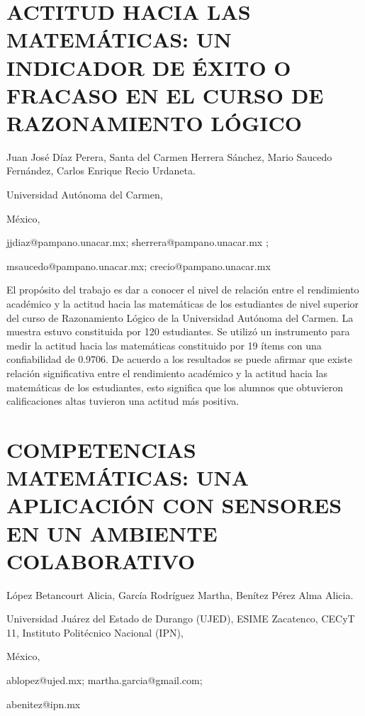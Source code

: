 \section{ACTITUD HACIA LAS MATEMÁTICAS: UN INDICADOR DE ÉXITO O FRACASO EN
EL CURSO DE RAZONAMIENTO LÓGICO}

\begin{datos}

Juan José Díaz Perera, Santa del Carmen Herrera Sánchez, Mario Saucedo
Fernández, Carlos Enrique Recio Urdaneta.

Universidad Autónoma del Carmen,

México,

jjdiaz@pampano.unacar.mx; sherrera@pampano.unacar.mx ;

msaucedo@pampano.unacar.mx; crecio@pampano.unacar.mx

\end{datos}

El propósito del trabajo es dar a conocer el nivel de relación entre
el rendimiento académico y la actitud hacia las matemáticas de los
estudiantes de nivel superior del curso de Razonamiento Lógico de
la Universidad Autónoma del Carmen. La muestra estuvo constituida
por 120 estudiantes. Se utilizó un instrumento para medir la actitud
hacia las matemáticas constituido por 19 ítems con una confiabilidad
de 0.9706. De acuerdo a los resultados se puede afirmar que existe
relación significativa entre el rendimiento académico y la actitud
hacia las matemáticas de los estudiantes, esto significa que los alumnos
que obtuvieron calificaciones altas tuvieron una actitud más positiva.


\section{COMPETENCIAS MATEMÁTICAS: UNA APLICACIÓN CON SENSORES EN UN AMBIENTE
COLABORATIVO}

\begin{datos}

López Betancourt Alicia, García Rodríguez Martha, Benítez Pérez Alma
Alicia.

Universidad Juárez del Estado de Durango (UJED), ESIME Zacatenco,
CECyT 11, Instituto Politécnico Nacional (IPN),

México,

ablopez@ujed.mx; martha.garcia@gmail.com;

abenitez@ipn.mx 

\end{datos}

